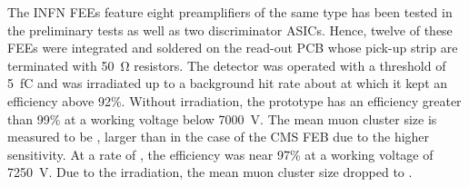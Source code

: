 	The INFN FEEs feature eight preamplifiers of the same type has been tested in the preliminary tests as well as two discriminator ASICs. Hence, twelve of these FEEs were integrated and soldered on the read-out PCB whose pick-up strip are terminated with \SI{50}{\ohm} resistors. The detector was operated with a threshold of \SI{5}{fC} and was irradiated up to a background hit rate about  at which it kept an efficiency above 92\%. Without irradiation, the prototype has an efficiency greater than 99\% at a working voltage below \SI{7000}{V}. The mean muon cluster size is measured to be , larger than in the case of the CMS FEB due to the higher sensitivity. At a rate of , the efficiency was near 97\% at a working voltage of \SI{7250}{V}. Due to the irradiation, the mean muon cluster size dropped to .
	
